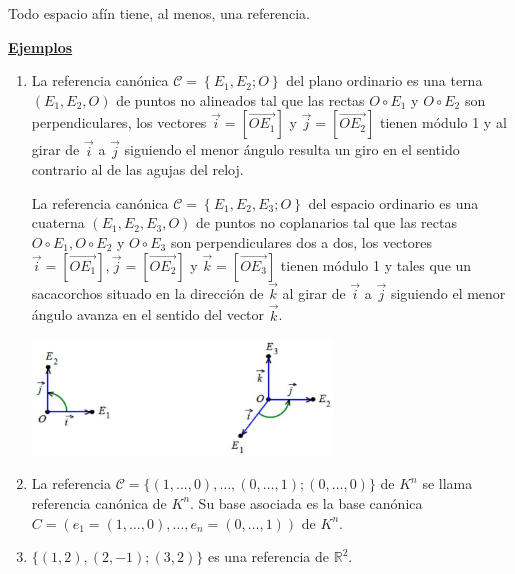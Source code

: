 \documentclass[12pt, a4paper, ones, notitlepage, openany,titlepage]{article}
\newcommand{\ejemplos}{\noindent\underline{\textbf{Ejemplos}}}
\begin{document}
\noindent Todo espacio afín tiene, al menos, una referencia.

\ejemplos
\begin{enumerate}[label=(\arabic*)]
\item La referencia canónica $\mathcal{C}=\left\{E_{1}, E_{2} ; O\right\}$ del plano ordinario es una terna $\left(E_{1}, E_{2}, O\right)$ de puntos no alineados tal que las rectas $O \circ E_{1}$ y $O \circ E_{2}$ son perpendiculares, los vectores $\overrightarrow{i}=\left[\overrightarrow{O E_{1}}\right]$ y $\overrightarrow{j}=\left[\overrightarrow{O E_{2}}\right]$ tienen módulo 1 y al girar de $\overrightarrow{i}$ a $\overrightarrow{j}$ siguiendo el menor ángulo resulta un giro en el sentido contrario al de las agujas del reloj.

La referencia canónica $\mathcal{C}=\left\{E_{1}, E_{2}, E_{3} ; O\right\}$ del espacio ordinario es una cuaterna $\left(E_{1}, E_{2}, E_{3}, O\right)$ de puntos no coplanarios tal que las rectas $O \circ E_{1}, O \circ E_{2}$ y $O \circ E_{3}$ son perpendiculares dos a dos, los vectores $\overrightarrow{i}=\left[\overrightarrow{O E_{1}}\right], \overrightarrow{j}=\left[\overrightarrow{O E_{2}}\right]$ y $\overrightarrow{k}=\left[\overrightarrow{O E_{3}}\right]$ tienen módulo 1 y tales que un sacacorchos situado en la dirección de $\overrightarrow{k}$ al girar de $\overrightarrow{i}$ a $\overrightarrow{j}$ siguiendo el menor ángulo avanza en el sentido del vector $\overrightarrow{k}$.

\includegraphics[max width=8cm, center]{2023_03_01_7659aec5e35f9a9b2d3cg-12(1)}

\item La referencia $\mathcal{C}=\{(1, \ldots, 0), \ldots,(0, \ldots, 1) ;(0, \ldots, 0)\}$ de $K^{n}$ se llama referencia canónica de $K^{n}$. Su base asociada es la base canónica $C=\left(e_{1}=(1, \ldots, 0), \ldots, e_{n}=(0, \ldots, 1)\right)$ de $K^{n}$.

\item $\{(1,2),(2,-1) ;(3,2)\}$ es una referencia de $\mathbb{R}^{2}$.
\end{enumerate}
\end{document}
